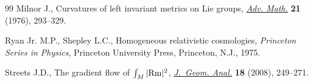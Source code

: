 \documentclass[10pt,a4paper]{amsart}
\numberwithin{equation}{section}
\begin{document}
\begin{thebibliography}{99}
Milnor J., Curvatures of left invariant metrics on {L}ie groups, \href{https://doi.org/10.1016/S0001-8708(76)80002-3}{\textit{Adv.
 Math.}} \textbf{21} (1976), 293--329.

Ryan Jr. M.P., Shepley L.C., Homogeneous relativistic cosmologies, \textit{Princeton
 Series in Physics}, Princeton University Press, Princeton, N.J., 1975.

Streets J.D., The gradient flow of {$\int_M|{\rm Rm}|^2$}, \href{https://doi.org/10.1007/s12220-007-9000-0}{\textit{J.~Geom.
 Anal.}} \textbf{18} (2008), 249--271.

\end{thebibliography}
\end{document}
